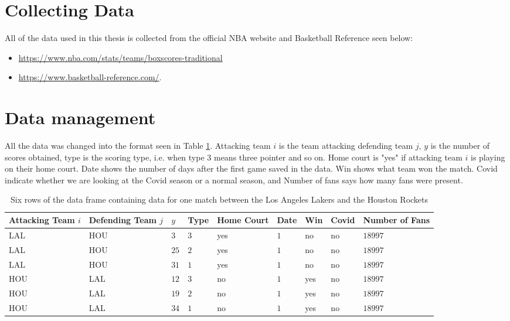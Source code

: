 
\section{Collecting Data}

\noindent All of the data used in this thesis is collected from the official NBA website and Basketball Reference seen below:

\begin{itemize}
  \item \url{https://www.nba.com/stats/teams/boxscores-traditional}
  \item \url{https://www.basketball-reference.com/}.
\end{itemize}

\section{Data management}

\noindent All the data was changed into the format seen in Table \ref{table:dataSaved}. Attacking team $i$ is the team attacking defending team $j$, $y$ is the number of scores obtained, type is the scoring type, i.e. when type 3 means three pointer and so on. Home court is "yes" if attacking team $i$ is playing on their home court. Date shows the number of days after the first game saved in the data. Win shows what team won the match. Covid indicate whether we are looking at the Covid season or a normal season, and Number of fans says how many fans were present.

\begin{table}[H]
\centering
\begin{tabular}{ |p{1.8cm}|p{1.8cm}|p{.5cm}|p{1cm}|p{1cm}|p{1cm}|p{1cm}|p{1cm}|p{1.5cm}|  }
    \hline
    Attacking Team $i$ & Defending Team $j$ & $y$ & Type & Home Court & Date & Win & Covid & Number of Fans \\
    \hline
    LAL & HOU & $3$ & $3$ & yes & $1$ & no & no & $18997$ \\
    LAL & HOU & $25$ & $2$ & yes & $1$ & no & no & $18997$ \\
    LAL & HOU & $31$ & $1$ & yes & $1$ & no & no & $18997$ \\
    \hline
    HOU & LAL & $12$ & $3$ & no & $1$ & yes & no & $18997$ \\
    HOU & LAL & $19$ & $2$ & no & $1$ & yes & no & $18997$ \\
    HOU & LAL & $34$ & $1$ & no & $1$ & yes & no & $18997$ \\
    \hline
\end{tabular}
\caption{Six rows of the data frame containing data for one match between the Los Angeles Lakers and the Houston Rockets}
\label{table:dataSaved}
\end{table}


